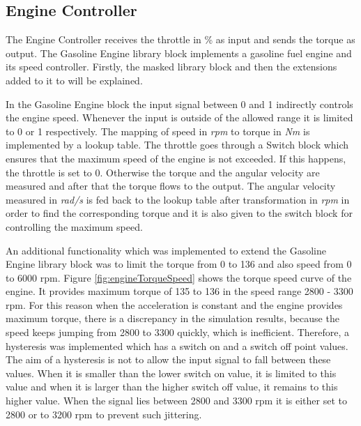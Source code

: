 \subsection{Engine Controller}
The Engine Controller receives the throttle in \% as input and sends the torque as output. The Gasoline Engine library block implements a gasoline fuel engine and its speed controller. Firstly, the masked library block and then the extensions added to it to will be explained.

In the Gasoline Engine block the input signal between 0 and 1 indirectly controls the engine speed. Whenever the input is outside of the allowed range it is limited to 0 or 1 respectively. The mapping of speed in \textit{rpm} to torque in \textit{Nm} is implemented by a lookup table. The throttle goes through a Switch block which ensures that the maximum speed of the engine is not exceeded. If this happens, the throttle is set to 0. Otherwise the torque and the angular velocity are measured and after that the torque flows to the output. The angular velocity measured in \textit{rad/s} is fed back to the lookup table after transformation in \textit{rpm} in order to find the corresponding torque and it is also given to the switch block for controlling the maximum speed.

An additional functionality which was implemented to extend the Gasoline Engine library block was to limit the torque from 0 to 136 and also speed from 0 to 6000 rpm. Figure \ref{fig:engineTorqueSpeed} shows the torque speed curve of the engine. It provides maximum torque of 135 to 136 in the speed range 2800 - 3300 rpm. For this reason when the acceleration is constant and the engine provides maximum torque, there is a discrepancy in the simulation results, because the speed keeps jumping from 2800 to 3300 quickly, which is inefficient. Therefore, a hysteresis was implemented which has a switch on and a switch off point values. The aim of a hysteresis is not to allow the input signal to fall between these values. When it is smaller than the lower switch on value, it is limited to this value and when it is larger than the higher switch off value, it remains to this higher value. When the signal lies between 2800 and 3300 rpm it is either set to 2800 or to 3200 rpm to prevent such jittering.

